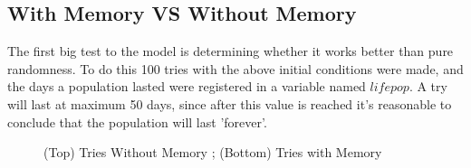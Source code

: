 \documentclass[a4paper,prd,twocolumn,nofootinbib,superscriptaddress,floatfix]{revtex4}
\begin{document}
\subsection{With Memory VS Without Memory}
 
 The first big test to the model is determining whether it works better than pure randomness. To do this 100 tries with the above initial conditions were made, and the days a population lasted were registered in a variable named $lifepop$. A try will last at maximum 50 days, since after this value is reached it's reasonable to conclude that the population will last 'forever'.
 
\begin{figure}[H] 
    \label{fig:5a} 

    \label{fig:5b} 
  \caption{(Top) Tries Without Memory ; (Bottom) Tries with Memory}
  \label{fig:5} 
\end{figure}
\end{document}
